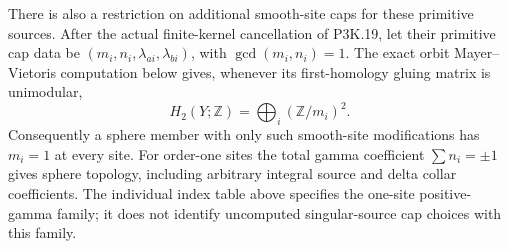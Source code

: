 \begin{theorem}
There is also a restriction on additional smooth-site caps for these
primitive sources.  After the actual finite-kernel cancellation of
P3K.19, let their primitive cap data be
\((m_i,n_i,\lambda_{ai},\lambda_{bi})\), with
\(\gcd(m_i,n_i)=1\).  The exact orbit Mayer--Vietoris computation
below gives, whenever its first-homology gluing matrix is unimodular,
\[
        H_2(Y;\mathbb Z)=\bigoplus_i(\mathbb Z/m_i)^2.       \tag{P3K.22.1}
\]
Consequently a sphere member with only such smooth-site modifications
has \(m_i=1\) at every site.  For order-one sites the total gamma
coefficient \(\sum n_i=\pm1\) gives sphere topology, including
arbitrary integral source and delta collar coefficients.  The
individual index table above specifies the one-site positive-gamma
family; it does not identify uncomputed singular-source cap choices
with this family.
\end{theorem}

